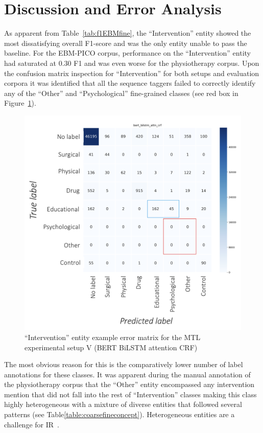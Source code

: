 \documentclass[runningheads]{llncs}
\begin{document}
\section{Discussion and Error Analysis}
\label{sec:err}
%
As apparent from Table~\ref{tab:f1EBMfine}, the ``Intervention'' entity showed the most dissatisfying overall F1-score and was the only entity unable to pass the baseline.
For the EBM-PICO corpus, performance on the ``Intervention'' entity had saturated at 0.30 F1 and was even worse for the physiotherapy corpus.
Upon the confusion matrix inspection for ``Intervention'' for both setups and evaluation corpora it was identified that all the sequence taggers failed to correctly identify any of the ``Other'' and ``Psychological'' fine-grained classes (see red box in Figure~\ref{fig:MTLexp1cm}).
%
\begin{figure}
    \centering
    \includegraphics[scale=0.42]{figures/confusionmatrix.png}
    \caption{``Intervention'' entity example error matrix for the MTL experimental setup V (BERT BiLSTM attention CRF)}
    \label{fig:MTLexp1cm}
\end{figure}
%
The most obvious reason for this is the comparatively lower number of label annotations for these classes.
It was apparent during the manual annotation of the physiotherapy corpus that the ``Other'' entity encompassed any intervention mention that did not fall into the rest of ``Intervention'' classes making this class highly heterogeneous with a mixture of diverse entities that followed several patterns (see Table\ref{table:coarsefineconcept}).
Heterogeneous entities are a challenge for IR~\cite{jaseena2014issues}.
\end{document}
